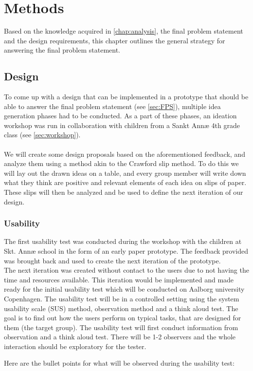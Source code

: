 \chapter{Methods}
Based on the knowledge acquired in \autoref{chap:analysis}, the final problem statement and the design requirements, this chapter outlines the general strategy for answering the final problem statement.
\section{Design}
To come up with a design that can be implemented in a prototype that should be able to answer the final problem statement (see \autoref{sec:FPS}), multiple idea generation phases had to be conducted. As a part of these phases, an ideation workshop was run in collaboration with children from a Sankt Annæ 4th grade class (see \autoref{sec:workshop}).\\\\
We will create some design proposals based on the aforementioned feedback, and analyze them using a method akin to the Crawford slip method\cite{crawfordSlip}. To do this we will lay out the drawn ideas on a table, and every group member will write down what they think are positive and relevant elements of each idea on slips of paper. These slips will then be analyzed and be used to define the next iteration of our design.

\subsection{Usability}
\setlength{\parskip}{1em}
The first usability test was conducted during the workshop with the children at Skt. Annæ school in the form of an early paper prototype. The feedback provided was brought back and used to create the next iteration of the prototype. \\
The next iteration was created without contact to the users due to not having the time and resources available. This iteration would be implemented and made ready for the initial usability test which will be conducted on Aalborg university Copenhagen.
The usability test will be in a controlled setting using the system usability scale (SUS) method, observation method and a think aloud test. The goal is to find out how the users perform on typical tasks, that are designed for them (the target group). 
The usability test will first conduct information from observation and a think aloud test. There will be 1-2 observers and the whole interaction should be exploratory for the tester. \par
Here are the bullet points for what will be observed during the usability test:\par

